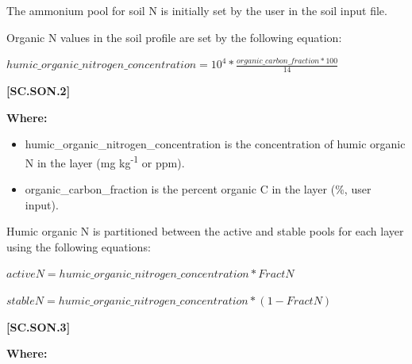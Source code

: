 The ammonium pool for soil N is initially set by the user in the soil input file.
\vspace{0.2cm}

Organic N values in the soil profile are set by the following equation:
            \vspace{0.5cm}
            
    \begin{center}
 \(humic\_organic\_nitrogen\_concentration =10^4 * \frac{organic\_carbon\_fraction * 100}{14}	\)
    \end{center}
        \vspace{0.5cm} 
    
            {\raggedleft \textbf{[SC.SON.2]}\par}
            \vspace{0.5cm}

        \textbf{Where:}
            
        \begin{itemize}
            \item humic\_organic\_nitrogen\_concentration  is the concentration of humic organic N in the layer (mg kg\textsuperscript{-1} or ppm).
            \item organic\_carbon\_fraction is the percent organic C in the layer (\%, user input).
        \end{itemize}
    \vspace{0.5cm}

Humic organic N is partitioned between the active and stable pools for each layer using the following equations:
\vspace{0.2cm}
            
    \begin{center}
 \(activeN= humic\_organic\_nitrogen\_concentration * FractN\)
 \vspace{0.1cm}
 
 \(stableN =humic\_organic\_nitrogen\_concentration * (1-FractN)	\)
    \end{center}
        \vspace{0.5cm} 
    
            {\raggedleft \textbf{[SC.SON.3]}\par}
            \vspace{0.5cm}

        \textbf{Where:}
            
